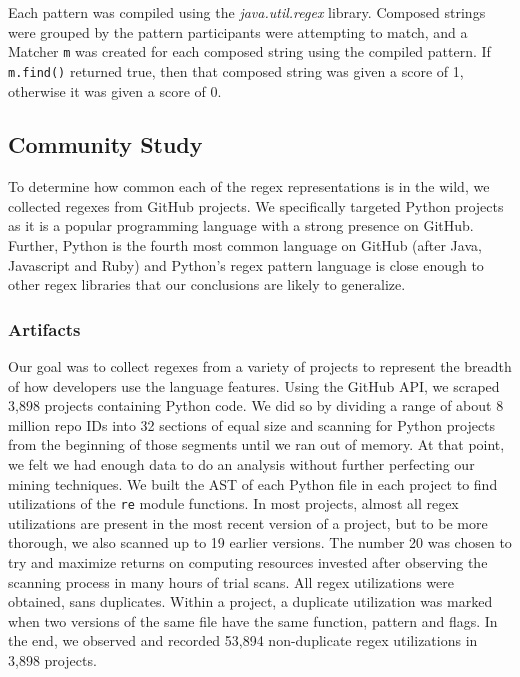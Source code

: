 Each pattern was compiled using the \emph{java.util.regex} library.
Composed strings were grouped by the pattern participants were attempting to match, and a Matcher \verb!m! was created for each composed string using the compiled pattern.  If \verb!m.find()! returned true, then that composed string was given a score of 1, otherwise it was given a score of 0.

\subsection{Community Study}
\label{communitystudy}
To determine how common each of the regex representations is in the wild, we collected
regexes from GitHub projects. We specifically targeted Python projects as it is a popular programming language with a strong presence on GitHub. Further, Python is the fourth most common language on GitHub (after Java, Javascript and Ruby) and Python's regex pattern
language is close enough to other regex libraries that our conclusions are likely to generalize.



\subsubsection{Artifacts}
Our goal was to collect regexes from a variety of projects to represent the breadth of how developers use the language features.
Using the GitHub API, we scraped 3,898 projects containing Python code.
We did so  by dividing a range of about 8 million repo IDs
into 32 sections of equal size and scanning  for Python projects from the beginning of those
segments until we ran out of memory. At that point, we felt we had enough data
to do an analysis without further perfecting our mining techniques. We built
the AST of each Python file in each project to find utilizations of the {\tt re} module
functions. In most projects, almost all regex utilizations are present in the
most recent version of a project, but to be more thorough, we also scanned up
to 19 earlier versions. The number 20 was chosen to try and maximize returns on
computing resources invested after observing the scanning process in many hours
of trial scans.
All regex utilizations were obtained, sans duplicates. Within a project, a duplicate utilization was marked when two versions of the same file have the same function, pattern and flags.  In the end, we observed and recorded 53,894 non-duplicate regex utilizations in 3,898 projects.

